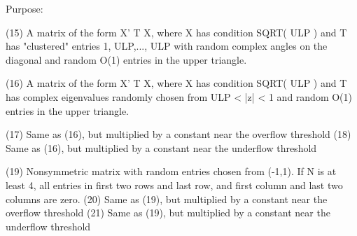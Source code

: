 \begin{DoxyParagraph}{Purpose\+: }
\begin{DoxyVerb}
    (15) A matrix of the form  X' T X, where X has condition
         SQRT( ULP ) and T has "clustered" entries 1, ULP,..., ULP
         with random complex angles on the diagonal and random O(1)
         entries in the upper triangle.

    (16) A matrix of the form  X' T X, where X has condition
         SQRT( ULP ) and T has complex eigenvalues randomly chosen
         from ULP < |z| < 1 and random O(1) entries in the upper
         triangle.

    (17) Same as (16), but multiplied by a constant
         near the overflow threshold
    (18) Same as (16), but multiplied by a constant
         near the underflow threshold

    (19) Nonsymmetric matrix with random entries chosen from (-1,1).
         If N is at least 4, all entries in first two rows and last
         row, and first column and last two columns are zero.
    (20) Same as (19), but multiplied by a constant
         near the overflow threshold
    (21) Same as (19), but multiplied by a constant
         near the underflow threshold\end{DoxyVerb}
 
\end{DoxyParagraph}

